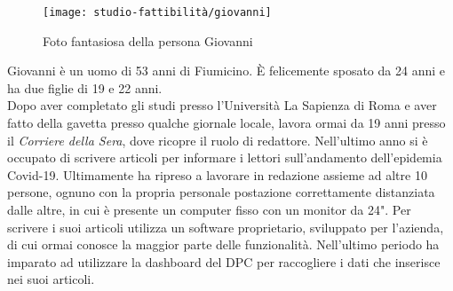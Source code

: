 \begin{wrapfigure}{r}{8cm}
    \texttt{[image: studio-fattibilità/giovanni]}
    \caption{Foto fantasiosa della persona Giovanni}
\end{wrapfigure}

Giovanni è un uomo di 53 anni di Fiumicino. È felicemente sposato da 24 anni e ha due figlie di 19 e 22 anni.\\ 
Dopo aver completato gli studi presso l'Università La Sapienza di Roma e aver fatto della gavetta presso qualche giornale locale, lavora ormai da 19 anni presso il \textit{Corriere della Sera}, dove ricopre il ruolo di redattore. Nell'ultimo anno si è occupato di scrivere articoli per informare i lettori sull'andamento dell'epidemia Covid-19. Ultimamente ha ripreso a lavorare in redazione assieme ad altre 10 persone, ognuno con la propria personale postazione correttamente distanziata dalle altre, in cui è presente un computer fisso con un monitor da 24".
Per scrivere i suoi articoli utilizza un software proprietario, sviluppato per l'azienda, di cui ormai conosce la maggior parte delle funzionalità. Nell'ultimo periodo ha imparato ad utilizzare la dashboard del DPC per raccogliere i dati che inserisce nei suoi articoli.

